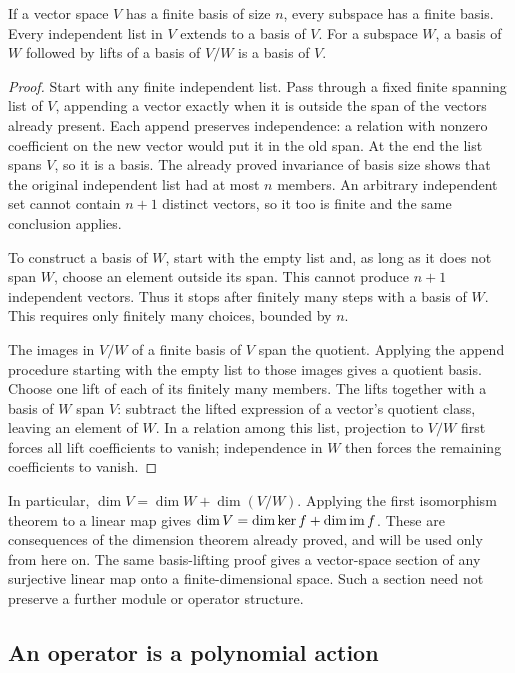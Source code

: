 \begin{lemma}\label{m:bases}
If a vector space $V$ has a finite basis of size $n$, every subspace has
a finite basis. Every independent list in $V$ extends to a basis of $V$.
For a subspace $W$, a basis of $W$ followed by lifts of a basis of $V/W$
is a basis of $V$.
\end{lemma}
\begin{proof}
Start with any finite independent list. Pass through a fixed finite
spanning list of $V$, appending a vector exactly when it is outside
the span of the vectors already present. Each append preserves
independence: a relation with nonzero coefficient on the new vector
would put it in the old span. At the end the list spans $V$, so it is
a basis. The already proved invariance of basis size shows that the
original independent list had at most $n$ members.
An arbitrary independent set cannot contain $n+1$ distinct vectors,
so it too is finite and the same conclusion applies.

To construct a basis of $W$, start with the empty list and, as long
as it does not span $W$, choose an element outside its span. This
cannot produce $n+1$ independent vectors. Thus it stops after finitely
many steps with a basis of $W$. This requires only finitely many
choices, bounded by $n$.

The images in $V/W$ of a finite basis of $V$ span the quotient.
Applying the append procedure starting with the empty list to those
images gives a quotient basis. Choose one lift of each of its finitely
many members. The lifts together with a basis of $W$ span $V$:
subtract the lifted expression of a vector's quotient class, leaving
an element of $W$. In a relation among this list, projection to $V/W$
first forces all lift coefficients to vanish; independence in $W$
then forces the remaining coefficients to vanish.
\end{proof}

In particular, $\dim V=\dim W+\dim(V/W)$. Applying the first
isomorphism theorem to a linear map gives
$\dim V=\dim\operatorname{ker} f+\dim\operatorname{im} f$. These are consequences of the
dimension theorem already proved, and will be used only from here on.
The same basis-lifting proof gives a vector-space section of any
surjective linear map onto a finite-dimensional space. Such a section
need not preserve a further module or operator structure.

\subsection{An operator is a polynomial action}
\label{m:operators}

